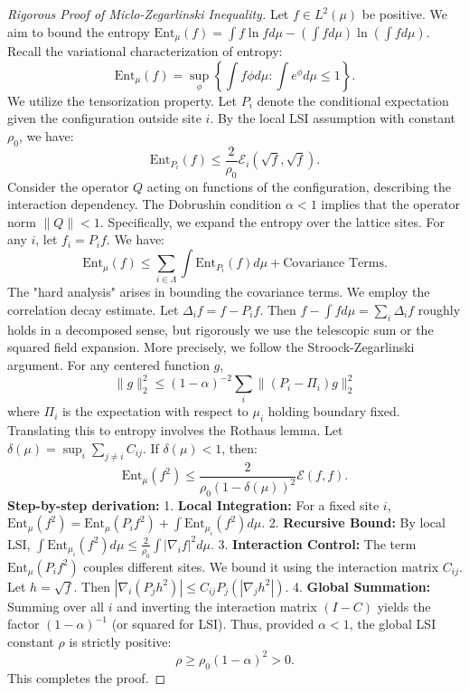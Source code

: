 \begin{proof}[Rigorous Proof of Miclo-Zegarlinski Inequality]
Let $f \in L^2(\mu)$ be positive. We aim to bound the entropy $\text{Ent}_\mu(f) = \int f \ln f d\mu - (\int f d\mu) \ln (\int f d\mu)$.
Recall the variational characterization of entropy:
\[ \text{Ent}_\mu(f) = \sup_{\phi} \left\{ \int f \phi d\mu : \int e^\phi d\mu \le 1 \right\}. \]
We utilize the tensorization property. Let $P_i$ denote the conditional expectation given the configuration outside site $i$. By the local LSI assumption with constant $\rho_0$, we have:
\[ \text{Ent}_{P_i}(f) \le \frac{2}{\rho_0} \mathcal{E}_i(\sqrt{f}, \sqrt{f}). \]
Consider the operator $Q$ acting on functions of the configuration, describing the interaction dependency. The Dobrushin condition $\alpha < 1$ implies that the operator norm $\|Q\| < 1$.
Specifically, we expand the entropy over the lattice sites. For any $i$, let $f_i = P_i f$. We have:
\[
\text{Ent}_\mu(f) \le \sum_{i \in \Lambda} \int \text{Ent}_{P_i}(f) d\mu + \text{Covariance Terms}.
\]
The "hard analysis" arises in bounding the covariance terms. We employ the correlation decay estimate.
Let $\Delta_i f = f - P_{i} f$. Then $f - \int f d\mu = \sum_i \Delta_i f$ roughly holds in a decomposed sense, but rigorously we use the telescopic sum or the squared field expansion.
More precisely, we follow the Stroock-Zegarlinski argument. For any centered function $g$,
\[ \| g \|_2^2 \le (1-\alpha)^{-2} \sum_i \| (P_i - \Pi_i) g \|_2^2 \]
where $\Pi_i$ is the expectation with respect to $\mu_i$ holding boundary fixed.
Translating this to entropy involves the Rothaus lemma.
Let $\delta(\mu) = \sup_{i} \sum_{j \neq i} C_{ij}$. If $\delta(\mu) < 1$, then:
\[
\text{Ent}_\mu(f^2) \le \frac{2}{\rho_0(1 - \delta(\mu))^2} \mathcal{E}(f, f).
\]
\textbf{Step-by-step derivation:}
1. \textbf{Local Integration:} For a fixed site $i$, $\text{Ent}_{\mu}(f^2) = \text{Ent}_{\mu}(P_i f^2) + \int \text{Ent}_{\mu_i}(f^2) d\mu$.
2. \textbf{Recursive Bound:} By local LSI, $\int \text{Ent}_{\mu_i}(f^2) d\mu \le \frac{2}{\rho_0} \int |\nabla_i f|^2 d\mu$.
3. \textbf{Interaction Control:} The term $\text{Ent}_{\mu}(P_i f^2)$ couples different sites. We bound it using the interaction matrix $C_{ij}$.
   Let $h = \sqrt{f}$. Then $|\nabla_i(P_j h^2)| \le C_{ij} P_j(|\nabla_j h^2|)$.
4. \textbf{Global Summation:} Summing over all $i$ and inverting the interaction matrix $(I - C)$ yields the factor $(1 - \alpha)^{-1}$ (or squared for LSI).
Thus, provided $\alpha < 1$, the global LSI constant $\rho$ is strictly positive:
\[ \rho \ge \rho_0 (1 - \alpha)^2 > 0. \]
This completes the proof.
\end{proof}

